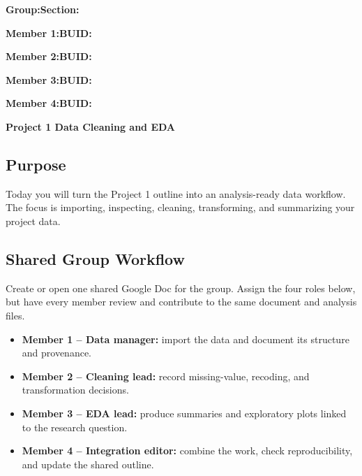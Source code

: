 \documentclass{article}
\newcommand{\projecttitle}{Project 1 Data Cleaning and EDA}
\newcommand{\blankline}{\underline{\phantom{XXXXXXXXXXXXXXXXXXXXXXXX}}}
\newcommand{\blankid}{\underline{\phantom{XXXXXXXXXXXXXXX}}}
\begin{document}
\noindent\textbf{Group:}\blankline{}\hfill\textbf{Section:}\blankid{}

\medskip
\noindent\textbf{Member 1:}\blankline{}\hfill\textbf{BUID:}\blankid{}

\medskip
\noindent\textbf{Member 2:}\blankline{}\hfill\textbf{BUID:}\blankid{}

\medskip
\noindent\textbf{Member 3:}\blankline{}\hfill\textbf{BUID:}\blankid{}

\medskip
\noindent\textbf{Member 4:}\blankline{}\hfill\textbf{BUID:}\blankid{}

\begin{center}
  {\Large \textbf{\projecttitle{}}}
\end{center}

\subsection*{Purpose}
Today you will turn the Project 1 outline into an analysis-ready data workflow. The focus is importing, inspecting, cleaning, transforming, and summarizing your project data.

\subsection*{Shared Group Workflow}
Create or open one shared Google Doc for the group. Assign the four roles below, but have every member review and contribute to the same document and analysis files.
\begin{itemize}[itemsep=.25em]
  \item \textbf{Member 1 -- Data manager:} import the data and document its structure and provenance.
  \item \textbf{Member 2 -- Cleaning lead:} record missing-value, recoding, and transformation decisions.
  \item \textbf{Member 3 -- EDA lead:} produce summaries and exploratory plots linked to the research question.
  \item \textbf{Member 4 -- Integration editor:} combine the work, check reproducibility, and update the shared outline.
\end{itemize}
\end{document}
